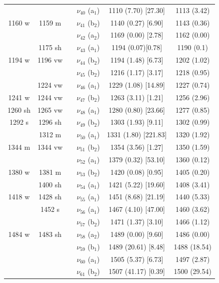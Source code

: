 \begin{table}[H]
\begin{center}
\begin{tabular}{c c c c c c}
 &  &  & $\nu_{40}$ (a$_{1}$) & 1110 (7.70) [27.30] & 1113 (3.42) \\ 
 1160 w & 1159 m &  & $\nu_{41}$ (b$_{2}$) & 1140 (0.27) [6.90] & 1143 (0.36) \\ 
 &  &  & $\nu_{42}$ (a$_{2}$) & 1169 (0.00) [2.78] & 1162 (0.00) \\ 
 & 1175 sh &  & $\nu_{43}$ (a$_{1}$) & 1194 (0.07)[0.78] & 1190 (0.1) \\ 
 1194 w & 1196 vw &  & $\nu_{44}$ (b$_{2}$) & 1194 (1.48) [6.73]  & 1202 (1.02) \\ 
 &  &  &  $\nu_{45}$ (b$_{2}$) & 1216 (1.17) [3.17] & 1218 (0.95) \\ 
 & 1224 vw &  &   $\nu_{46}$ (a$_{1}$) & 1229 (1.08) [14.89] & 1227 (0.74) \\ 
 1241 w & 1244 vw &  &   $\nu_{47}$ (b$_{2}$) &  1263 (3.11) [1.21] & 1256 (2.96) \\ 
 1260 sh & 1265 vw &  &   $\nu_{48}$ (a$_{1}$) & 1280 (0.80) [23.66] &   1277 (0.85) \\ 
 1292 s & 1296 sh &  & $\nu_{49}$ (b$_{2}$) & 1303 (1.93) [9.11]  & 1302 (0.99) \\ 
 & 1312 m & \multicolumn{1}{l}{} & $\nu_{50}$ (a$_{1}$) & 1331 (1.80) [221.83] & 1320 (1.92) \\ 
 1344 m &  1344 vw  & \multicolumn{1}{l}{} & $\nu_{51}$ (b$_{2}$) & 1354 (3.56) [1.27]  & 1350 (1.59) \\ 
 &  & \multicolumn{1}{l}{} & $\nu_{52}$ (a$_{1}$) & 1379 (0.32) [53.10] & 1360 (0.12) \\ 
 1380 w & 1381 m & \multicolumn{1}{l}{} & $\nu_{53}$ (b$_{2}$) & 1420 (0.08) [0.95] & 1405 (0.20) \\ 
 & 1400 sh & \multicolumn{1}{l}{} &  $\nu_{54}$ (a$_{1}$) & 1421 (5.22) [19.60] & 1408 (3.41) \\ 
 1418 w & 1428 sh & \multicolumn{1}{l}{} &   $\nu_{55}$ (a$_{1}$) &    1451 (8.68) [21.19] & 1440 (5.33) \\ 
 &    1452 s & \multicolumn{1}{l}{} &   $\nu_{56}$ (a$_{1}$) &     1467 (4.10) [47.00]   & 1460 (3.62) \\ 
 &  & \multicolumn{1}{l}{} &   $\nu_{57}$ (b$_{2}$) & 1471 (1.37) [3.10] & 1466 (1.12) \\ 
 1484 w &     1483 sh & \multicolumn{1}{l}{} & $\nu_{58}$ (a$_{2}$) & 1489 (0.00) [9.60] & 1486 (0.00) \\
  &  & \multicolumn{1}{l}{} & $\nu_{59}$ (b$_{1}$) & 1489 (20.61) [8.48] &  1488 (18.54) \\ 
  &  & \multicolumn{1}{l}{} & $\nu_{60}$ (a$_{1}$) & 1505 (5.37) [6.73] &  1497 (2.87) \\ 
  &  & \multicolumn{1}{l}{} & $\nu_{61}$ (b$_{2}$) & 1507 (41.17) [0.39] & 1500 (29.54) \\
 \bottomrule
\end{tabular}
\end{center}
\end{table}
 
